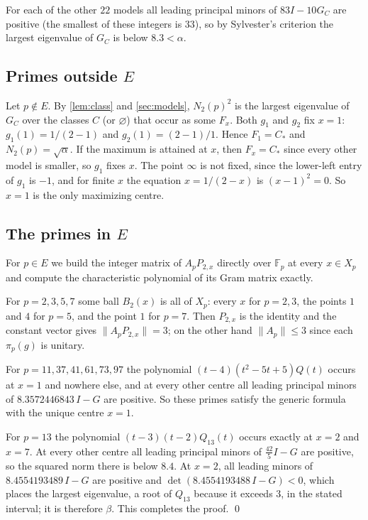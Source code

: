 \documentclass[11pt,a4paper]{article}
\numberwithin{equation}{section}
\theoremstyle{remark}
\newcommand{\F}{\mathbb F}
\begin{document}
For each of the other $22$ models all leading principal minors of $83I-10G_C$ are positive (the smallest of these integers is $33$), so by Sylvester's criterion the largest eigenvalue of $G_C$ is below $8.3<\alpha$.

\subsection{Primes outside \texorpdfstring{$E$}{E}}

Let $p\notin E$. By \cref{lem:class} and \cref{sec:models}, $N_2(p)^2$ is the largest eigenvalue of $G_C$ over the classes $C$ (or $\varnothing$) that occur as some $F_x$. Both $g_1$ and $g_2$ fix $x=1$: $g_1(1)=1/(2-1)$ and $g_2(1)=(2-1)/1$. Hence $F_1=C_*$ and $N_2(p)=\sqrt\alpha$. If the maximum is attained at $x$, then $F_x=C_*$ since every other model is smaller, so $g_1$ fixes $x$. The point $\infty$ is not fixed, since the lower-left entry of $g_1$ is $-1$, and for finite $x$ the equation $x=1/(2-x)$ is $(x-1)^2=0$. So $x=1$ is the only maximizing centre.

\subsection{The primes in \texorpdfstring{$E$}{E}}

For $p\in E$ we build the integer matrix of $A_pP_{2,x}$ directly over $\F_p$ at every $x\in X_p$ and compute the characteristic polynomial of its Gram matrix exactly.

For $p=2,3,5,7$ some ball $B_2(x)$ is all of $X_p$: every $x$ for $p=2,3$, the points $1$ and $4$ for $p=5$, and the point $1$ for $p=7$. Then $P_{2,x}$ is the identity and the constant vector gives $\|A_pP_{2,x}\|=3$; on the other hand $\|A_p\|\le3$ since each $\pi_p(g)$ is unitary.

For $p=11,37,41,61,73,97$ the polynomial $(t-4)(t^2-5t+5)Q(t)$ occurs at $x=1$ and nowhere else, and at every other centre all leading principal minors of $8.3572446843\,I-G$ are positive. So these primes satisfy the generic formula with the unique centre $x=1$.

For $p=13$ the polynomial $(t-3)(t-2)Q_{13}(t)$ occurs exactly at $x=2$ and $x=7$. At every other centre all leading principal minors of $\frac{42}{5}I-G$ are positive, so the squared norm there is below $8.4$. At $x=2$, all leading minors of $8.4554193489\,I-G$ are positive and $\det(8.4554193488\,I-G)<0$, which places the largest eigenvalue, a root of $Q_{13}$ because it exceeds $3$, in the stated interval; it is therefore $\beta$. This completes the proof. \qed
\end{document}
